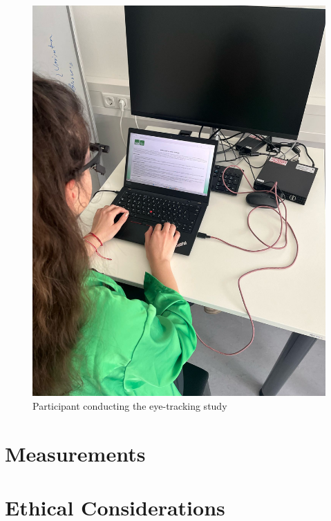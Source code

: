 \begin{figure} [H]
  \centering
  \includegraphics[scale=0.2]{figures/user.jpg}
  \caption{Participant conducting the eye-tracking study }
  \label{fig:AnhangsChor}
\end{figure}





\section{Measurements}


\section{Ethical Considerations}

